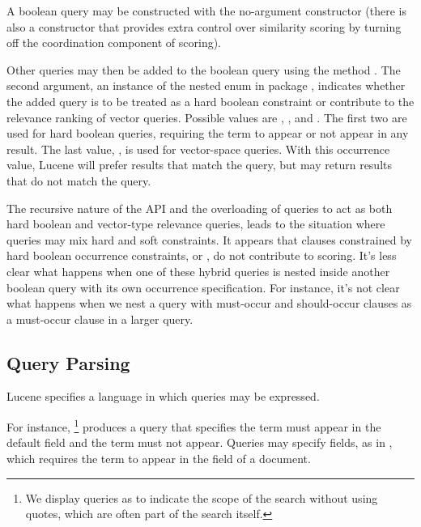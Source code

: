 A boolean query may be constructed with the no-argument constructor
 (there is also a constructor that provides extra
control over similarity scoring by turning off the coordination component
of scoring).

Other queries may then be added to the boolean query using the method
.  The second argument, an
instance of the nested enum  in package
, indicates whether the added query is to be treated as a
hard boolean constraint or contribute to the relevance ranking of
vector queries.  Possible values are ,
, and .  The
first two are used for hard boolean queries, requiring the term to
appear or not appear in any result.  The last value, , is
used for vector-space queries.  With this occurrence value, Lucene
will prefer results that match the query, but may return results that
do not match the query.%

The recursive nature of the API and the overloading of queries to act
as both hard boolean and vector-type relevance queries, leads to the
situation where queries may mix hard and soft constraints.  It appears
that clauses constrained by hard boolean occurrence constraints,
 or , do not contribute to scoring.  It's
less clear what happens when one of these hybrid queries is nested
inside another boolean query with its own occurrence specification.
For instance, it's not clear what happens when we nest a query with
must-occur and should-occur clauses as a must-occur clause in a larger
query.
%


\subsection{Query Parsing}

Lucene specifies a language in which queries may be expressed.  

For instance, %
%
\footnote{We display queries  as  to
indicate the scope of the search without using quotes, which are often
part of the search itself.}
%
produces a query that specifies the term  must
appear in the default field and the term  must not
appear.  Queries may specify fields, as in ,
which requires the term  to appear in the
 field of a document.

